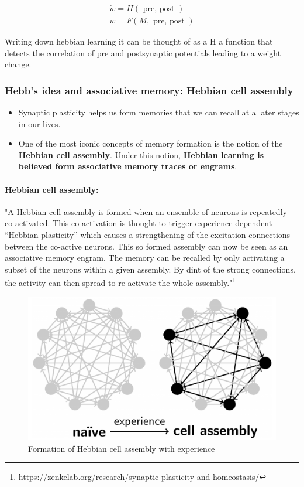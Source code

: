 \documentclass[main]{subfiles}
\begin{document}
\begin{equation}
\begin{array}{l}
{\dot{w}=H(\text { pre, post })} \\
{\dot{w}=F(M, \text { pre, post })}
\end{array}
\end{equation}
    

Writing down hebbian learning it can be thought of as a H a function that detects the correlation of pre and postsynaptic potentials leading to a weight change. 



\subsubsection{Hebb's idea and associative memory: Hebbian cell assembly}
\begin{itemize}
    \item Synaptic plasticity helps us form memories that we can recall at a later stages in our lives.
    \item One of the most iconic concepts of memory formation is the notion of the \textbf{Hebbian cell assembly}. Under this notion, \textbf{Hebbian learning is believed form associative memory traces or engrams}.
    
\end{itemize}
\paragraph{Hebbian cell assembly:} "A Hebbian cell assembly is formed when an ensemble of neurons is repeatedly co-activated. This co-activation is thought to trigger experience-dependent “Hebbian plasticity” which causes a strengthening of the excitation connections between the co-active neurons. This so formed assembly can now be seen as an associative memory engram. The memory can be recalled by only activating a subset of the neurons within a given assembly. By dint of the strong connections, the activity can then spread to re-activate the whole assembly."\footnote{https://zenkelab.org/research/synaptic-plasticity-and-homeostasis/}

\begin{figure}[H]
    \centering
    \includegraphics[width=.8\textwidth]{03_PlasticityInTheBrain/figures/hebb_cell_assembly.png}
    \caption{Formation of Hebbian cell assembly with experience}
    \label{fig:cell_assembly}
\end{figure}
\end{document}
